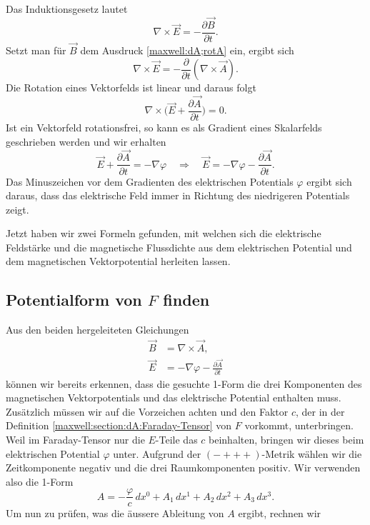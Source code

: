 Das Induktionsgesetz lautet
\begin{equation*}
	\nabla \times \vec{E} = - \frac{\partial \vec{B}}{\partial t}.
\end{equation*}
Setzt man für $\vec{B}$ dem Ausdruck \eqref{maxwell:dA;rotA} ein, ergibt sich
\begin{equation*}
	\nabla \times \vec{E} = - \frac{\partial}{\partial t}(\nabla \times \vec{A}).
\end{equation*}
Die Rotation eines Vektorfelds ist linear und daraus folgt
\begin{equation*}
	\nabla \times \biggl( \vec{E} + \frac{\partial \vec{A}}{\partial t}\biggr) = 0.
\end{equation*}
Ist ein Vektorfeld rotationsfrei, so kann es als Gradient eines Skalarfelds geschrieben werden und wir erhalten
\begin{equation}
	\label{maxwell:dA:defE}
	\vec{E} + \frac{\partial \vec{A}}{\partial t} = -\nabla \varphi \quad \Rightarrow \quad \vec{E} = -\nabla \varphi -\frac{\partial \vec{A}}{\partial t}.
\end{equation}
Das Minuszeichen vor dem Gradienten des elektrischen Potentials $\varphi$ ergibt sich daraus, dass das elektrische Feld immer in Richtung des niedrigeren Potentials zeigt.

Jetzt haben wir zwei Formeln gefunden, mit welchen sich die elektrische Feldstärke und die magnetische Flussdichte aus dem elektrischen Potential und dem magnetischen Vektorpotential herleiten lassen.
\subsection{Potentialform von $F$ finden}
Aus den beiden hergeleiteten Gleichungen
\begin{align*}
	\vec{B} &= \nabla \times \vec{A},\\
	\vec{E} &= -\nabla \varphi -\frac{\partial \vec{A}}{\partial t}
\end{align*}
können wir bereits erkennen, dass die gesuchte 1-Form die drei Komponenten des magnetischen Vektorpotentials und das elektrische Potential enthalten muss.
Zusätzlich müssen wir auf die Vorzeichen achten und den Faktor $c$, der in der Definition \eqref{maxwell:section:dA:Faraday-Tensor} von $F$ vorkommt, unterbringen.
Weil im Faraday-Tensor nur die $E$-Teile das $c$ beinhalten, bringen wir dieses beim elektrischen Potential $\varphi$ unter.
Aufgrund der $({-}{+}{+}{+})$-Metrik wählen wir die Zeitkomponente negativ und die drei Raumkomponenten positiv.
Wir verwenden also die 1-Form 
\begin{equation}
	A = -\frac{\varphi}{c}\,dx^0 + A_1 \,dx^1 + A_2 \,dx^2 + A_3 \,dx^3.
\end{equation}
Um nun zu prüfen, was die äussere Ableitung von $A$ ergibt, rechnen wir

